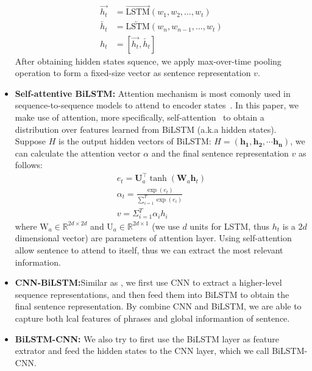 \documentclass[11pt,a4paper]{article}
\begin{document}
\begin{itemize}
\begin{equation}
\begin{aligned}
  		\overrightarrow{h_{t}}&=\overrightarrow{\mathrm{LSTM}}\left(w_{1}, w_{2}, \ldots, w_{t}\right)    \\
  		\overleftarrow{h_{t}}&=\overleftarrow{\mathrm{LSTM}}\left(w_{n}, w_{n-1}, \ldots, w_{t}\right)     \\
  		 h_{t}&=\left[\overrightarrow{h_{t}}, \overleftarrow{h_{t}}\right]
  	\end{aligned}
\end{equation}	
After obtaining hidden states squence, we apply max-over-time pooling operation to form a fixed-size vector as sentence representation $v$.
	\item \textbf{Self-attentive BiLSTM:} Attention mechanism is most comonly used in sequence-to-sequence models to attend to encoder states~\cite{DBLP:journals/corr/BahdanauCB14, DBLP:journals/corr/VaswaniSPUJGKP17}. In this paper, we make use of attention, more specifically, self-attention~\cite{DBLP:journals/corr/LinFSYXZB17} to obtain a distribution over features learned from BiLSTM (a.k.a hidden states). Suppose $H$ is the output hidden vectors of BiLSTM: $H=\left(\mathbf{h}_{\mathbf{1}}, \mathbf{h}_{\mathbf{2}}, \cdots \mathbf{h}_{\mathbf{n}}\right)$, we can calculate the attention vector $\alpha$ and the final sentence representation $v$ as follows:
\begin{equation}
\begin{aligned}
  		e_{t}=\mathbf{U}_{a}^{\top} \tanh \left(\mathbf{W}_{a} \mathbf{h}_{t}\right)    \\
  		\alpha_{t}=\frac{\exp \left(e_{t}\right)}{\sum_{i=1}^{T} \exp \left(e_{i}\right)}     \\
  		 v=\Sigma_{i=1}^{T} \alpha_{i} h_{i}
  	\end{aligned}
\end{equation}
where $\mathrm{W}_{a} \in \mathbb{R}^{2d \times 2d}$ and $\mathrm{U}_{a} \in \mathbb{R}^{2d \times 1}$ (we use $d$ units for LSTM, thus ${h_{t}}$ is a $2d$ dimensional vector) are parameters of attention layer.  Using self-attention allow sentence to attend to itself, thus we can extract the most relevant information.
	\item \textbf{CNN-BiLSTM:}Similar as \cite{DBLP:journals/corr/ZhouSLL15b}, we first use CNN to extract a higher-level sequence representations, and then feed them into BiLSTM to obtain the final sentence representation. By combine CNN and BiLSTM, we are able to capture both lcal features of phrases  and global informantion of sentence. 
	\item \textbf{BiLSTM-CNN:} We also try to first use the BiLSTM layer as feature extrator and feed the hidden states to the CNN layer, which we call BiLSTM-CNN.
\end{itemize}
\end{document}
